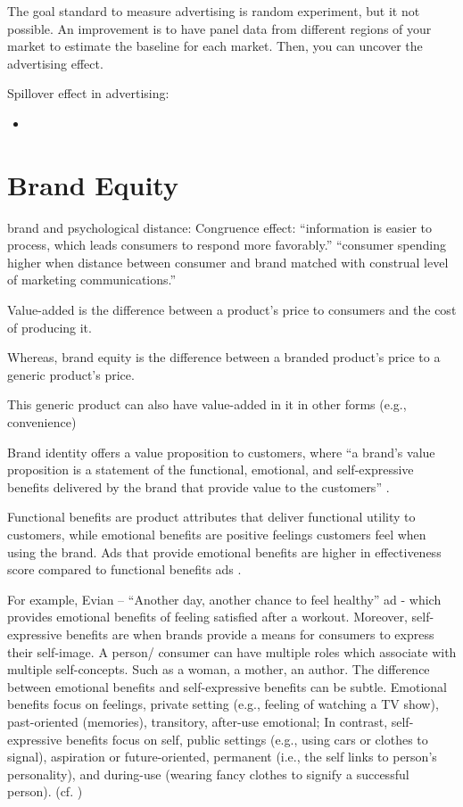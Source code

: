 \documentclass[
]{book}
\providecommand{\tightlist}{%
  \setlength{\itemsep}{0pt}\setlength{\parskip}{0pt}}
\begin{document}
The goal standard to measure advertising is random experiment, but it not
possible. An improvement is to have panel data from different regions of your
market to estimate the baseline for each market. Then, you can uncover the
advertising effect.

Spillover effect in advertising:

\begin{itemize}
\tightlist
\item
  \citep{Rutz_2011}
\end{itemize}

\hypertarget{brand-equity}{%
\chapter{Brand Equity}\label{brand-equity}}

brand and psychological distance: Congruence effect: ``information is easier to
process, which leads consumers to respond more favorably.'' \citep{Connors_2020}
``consumer spending higher when distance between consumer and brand matched with
construal level of marketing communications.''

Value-added is the difference between a product's price to consumers and the
cost of producing it.

Whereas, brand equity is the difference between a branded product's price to a
generic product's price.

This generic product can also have value-added in it in other forms (e.g.,
convenience)

Brand identity offers a value proposition to customers, where ``a brand's value
proposition is a statement of the functional, emotional, and self-expressive
benefits delivered by the brand that provide value to the customers''
\citep[pp.95]{Aaker_1996}.

Functional benefits are product attributes that deliver functional utility to
customers, while emotional benefits are positive feelings customers feel when
using the brand. Ads that provide emotional benefits are higher in effectiveness
score compared to functional benefits ads \citep[pp.98]{Aaker_1996}.

For example, Evian -- ``Another day, another chance to feel healthy'' ad - which
provides emotional benefits of feeling satisfied after a workout. Moreover,
self-expressive benefits are when brands provide a means for consumers to
express their self-image. A person/ consumer can have multiple roles which
associate with multiple self-concepts. Such as a woman, a mother, an author. The
difference between emotional benefits and self-expressive benefits can be
subtle. Emotional benefits focus on feelings, private setting (e.g., feeling of
watching a TV show), past-oriented (memories), transitory, after-use emotional;
In contrast, self-expressive benefits focus on self, public settings (e.g.,
using cars or clothes to signal), aspiration or future-oriented, permanent
(i.e., the self links to person's personality), and during-use (wearing fancy
clothes to signify a successful person). (cf. \citep[pp.99]{Aaker_1996})
\end{document}
